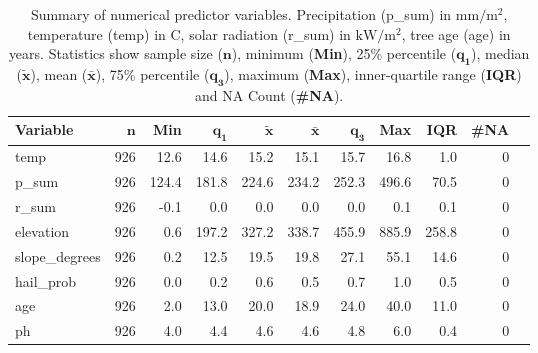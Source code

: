 \documentclass[review]{elsarticle}
\begin{document}
\begin{table}[H]
\centering
\begingroup\footnotesize
\begin{tabular}{lrrrrrrrrrr}
	\textbf{Variable} & $\mathbf{n}$ & \textbf{Min} & $\mathbf{q_1}$ & $\mathbf{\widetilde{x}}$ & $\mathbf{\bar{x}}$ & $\mathbf{q_3}$ & \textbf{Max} & \textbf{IQR} & \textbf{\#NA} \\
	\hline
	temp              & 926          & 12.6         & 14.6           & 15.2                     & 15.1               & 15.7           & 16.8         & 1.0          & 0             \\
	p\_sum            & 926          & 124.4        & 181.8          & 224.6                    & 234.2              & 252.3          & 496.6        & 70.5         & 0             \\
	r\_sum            & 926          & -0.1         & 0.0            & 0.0                      & 0.0                & 0.0            & 0.1          & 0.1          & 0             \\
	elevation         & 926          & 0.6          & 197.2          & 327.2                    & 338.7              & 455.9          & 885.9        & 258.8        & 0             \\
	slope\_degrees    & 926          & 0.2          & 12.5           & 19.5                     & 19.8               & 27.1           & 55.1         & 14.6         & 0             \\
	hail\_prob        & 926          & 0.0          & 0.2            & 0.6                      & 0.5                & 0.7            & 1.0          & 0.5          & 0             \\
	age               & 926          & 2.0          & 13.0           & 20.0                     & 18.9               & 24.0           & 40.0         & 11.0         & 0             \\
	ph                & 926          & 4.0          & 4.4            & 4.6                      & 4.6                & 4.8            & 6.0          & 0.4          & 0             \\
\end{tabular}
\endgroup
\caption{Summary of numerical predictor variables. Precipitation (p\_sum) in $\mathrm{mm/m^{2}}$, temperature (temp) in \degree C, solar radiation (r\_sum) in $\mathrm{kW/m^{2}}$, tree age (age) in years. Statistics show sample size ($\mathbf{n}$), minimum (\textbf{Min}), 25\% percentile ($\mathbf{q_1}$), median ($\mathbf{\widetilde{x}}$), mean ($\mathbf{\bar{x}}$), 75\% percentile ($\mathbf{q_3}$), maximum (\textbf{Max}), inner-quartile range (\textbf{IQR}) and NA Count (\textbf{\#NA}).}
\label{table:descriptive_summary_numeric}
\end{table}
\end{document}

